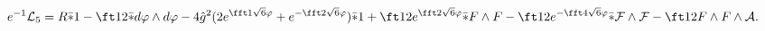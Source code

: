 \begin{equation}
e^{-1}{\cal L}_5 = R\bar *1-\ft12\bar*d\varphi\wedge d\varphi
-4\hat g^2(2e^{\fft1{\sqrt{6}}\varphi}+e^{-\fft2{\sqrt{6}}\varphi})\bar*1
+\ft12e^{\fft2{\sqrt{6}}\varphi}\bar*F\wedge
F-\ft12e^{-\fft4{\sqrt{6}}\varphi}
\bar*{\cal F}\wedge{\cal F}-\ft12F\wedge F\wedge{\cal A}.
\label{eq:d5n2lag2}
\end{equation}

